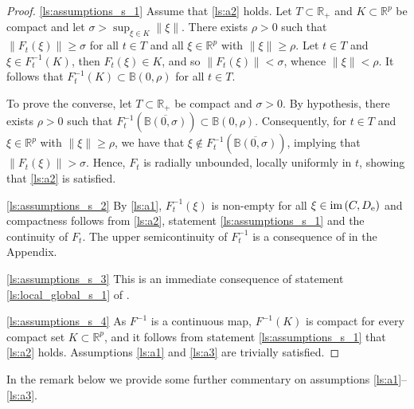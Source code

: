 \documentclass[a4paper,11pt]{article}
\newcommand{\B}{\mathbb B}
\newcommand{\R}{\mathbb R}
\numberwithin{equation}{section}
\numberwithin{figure}{section}
\numberwithin{table}{section}
\begin{document}
\begin{proof}
\ref{ls:assumptions_s_1} Assume that \ref{ls:a2} holds.
Let $T\subset\R_+$ and $K\subset\R^p$ be compact and let $\sigma>\sup_{\xi\in K}\|\xi\|$.
There exists $\rho>0$ such that $\|F_t(\xi)\|\geq\sigma$ for all $t\in T$ and all $\xi\in\R^p$
with $\|\xi\|\geq\rho$. Let $t\in T$ and $\xi\in F_t^{-1}(K)$, then $F_t(\xi)\in K$, and so
$\|F_t(\xi)\|<\sigma$, whence $\|\xi\|<\rho$. It follows that $F_t^{-1}(K)\subset\B(0,\rho)$
for all $t\in T$.

To prove the converse, let $T\subset\R_+$ be compact and $\sigma>0$. By hypothesis, there
exists $\rho>0$ such that $F_t^{-1}(\overline{\B(0,\sigma)})\subset\B(0,\rho)$. Consequently,
for $t\in T$ and $\xi\in\R^p$ with $\|\xi\|\geq\rho$, we have that $\xi\not\in F_t^{-1}(\overline{\B(0,\sigma)})$, implying that $\|F_t(\xi)\|>\sigma$. Hence, $F_t$ is
radially unbounded, locally uniformly in $t$, showing that \ref{ls:a2} is satisfied.

\ref{ls:assumptions_s_2} By \ref{ls:a1}, $F_t^{-1}(\xi)$ is non-empty for all $\xi\in
{\rm im}\,(C,D_{\rm e})$ and compactness follows from \ref{ls:a2}, statement \ref{ls:assumptions_s_1} and the continuity
of $F_t$. The upper semicontinuity of $F_t^{-1}$ is a consequence of 
in the Appendix.

\ref{ls:assumptions_s_3} This is an immediate consequence of statement \ref{ls:local_global_s_1}
of .

\ref{ls:assumptions_s_4} As $F^{-1}$ is a continuous map, $F^{-1}(K)$ is compact for every compact set $K\subset\R^p$, and it follows from statement \ref{ls:assumptions_s_1} that \ref{ls:a2} holds. Assumptions \ref{ls:a1} and \ref{ls:a3} are trivially satisfied.
\end{proof}
%
In the remark below we provide some further commentary on assumptions \ref{ls:a1}--\ref{ls:a3}.
%
\end{document}
